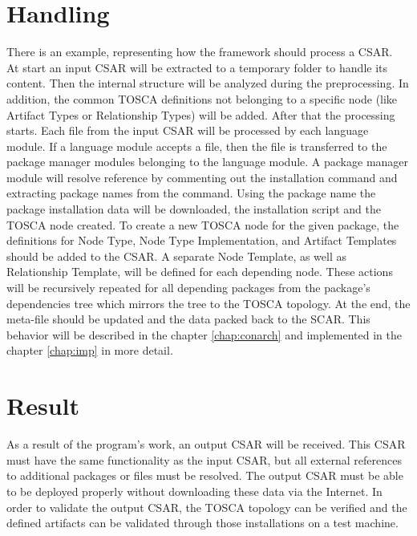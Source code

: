 \section*{Handling}
There is an example, representing how the framework should process a CSAR.\\
At start an input CSAR will be extracted to a temporary folder to handle its content.
Then the internal structure will be analyzed during the preprocessing. 
In addition, the common TOSCA definitions not belonging to a specific node (like Artifact Types or Relationship Types) will be added. 
After that the processing starts. 
Each file from the input CSAR will be processed by each language module.
If a language module accepts a file, then the file is transferred to the package manager modules belonging to the language module.
A package manager module will resolve reference by commenting out the installation command and extracting package names from the command.
Using the package name the package installation data will be downloaded, the installation script and the TOSCA node created. 
To create a new TOSCA node for the given package, the definitions for Node Type, Node Type Implementation, and Artifact Templates should be added to the CSAR. 
A separate Node Template, as well as Relationship Template, will be defined for each depending node.
These actions will be recursively repeated for all depending packages from the package's dependencies tree which mirrors the tree to the TOSCA topology.
At the end, the meta-file should be updated and the data packed back to the SCAR. %
This behavior will be described in the chapter \ref{chap:conarch} and implemented in the chapter \ref{chap:imp} in more detail.
\fi
\section*{Result}
As a result of the program's work, an output CSAR will be received.      
This CSAR must have the same functionality as the input CSAR, but all external references to additional packages or files must be resolved.
The output CSAR must be able to be deployed properly without downloading these data via the Internet. 
In order to validate the output CSAR, the TOSCA topology can be verified and the defined artifacts can be validated through those installations on a test machine. 
